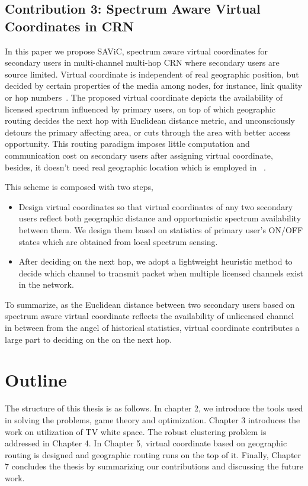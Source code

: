 \subsection*{Contribution 3: Spectrum Aware Virtual Coordinates in CRN}


In this paper we propose SAViC, spectrum aware virtual coordinates for secondary users in multi-channel multi-hop CRN where secondary users are source limited.
Virtual coordinate is independent of real geographic position, but decided by certain properties of the media among nodes, for instance, link quality or hop numbers~\cite{gpsfree05infocom}.
The proposed virtual coordinate depicts the availability of licensed spectrum influenced by primary users, on top of which geographic routing decides the next hop with Euclidean distance metric, and unconsciously detours the primary affecting area, or cuts through the area with better access opportunity.
This routing paradigm imposes little computation and communication cost on secondary users after assigning virtual coordinate, besides, it doesn't need real geographic location which is employed in ~\cite{search_geo_routing_chowdhury, routing-crn-jsac12}.

This scheme is composed with two steps,
\begin{itemize}
\item Design virtual coordinates so that virtual coordinates of any two secondary users reflect both geographic distance and opportunistic spectrum availability between them.
We design them based on statistics of primary user’s ON/OFF states which are obtained from local spectrum sensing.

\item After deciding on the next hop, we adopt a lightweight heuristic method to decide which channel to transmit packet when multiple licensed channels exist in the network.


\end{itemize}

To summarize, as the Euclidean distance between two secondary users based on spectrum aware virtual coordinate reflects the availability of unlicensed channel in between from the angel of historical statistics, virtual coordinate contributes a large part to deciding on the on the next hop. 



\section{Outline}
The structure of this thesis is as follows.
In chapter 2, we introduce the tools used in solving the problems, \ie game theory and optimization. 
Chapter 3 introduces the work on utilization of TV white space.
The robust clustering problem is addressed in Chapter 4.
In Chapter 5, virtual coordinate based on geographic routing is designed and geographic routing runs on the top of it.
Finally, Chapter 7 concludes the thesis by summarizing our contributions and discussing the future work.




